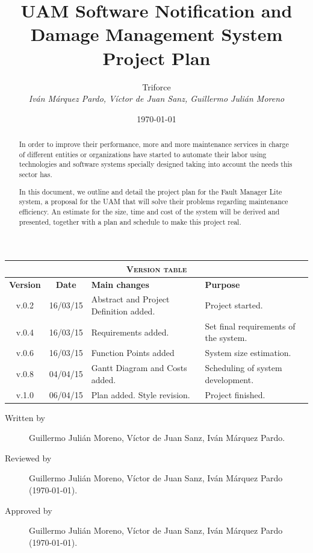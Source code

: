 \documentclass[11pt]{report}
\title{UAM Software Notification and Damage Management System \\ Project Plan}
\date{\today}
\author{{\Large Triforce} \\ \vspace{5pt} \textit{Iván Márquez Pardo, Víctor de Juan Sanz, Guillermo Julián Moreno}}
\begin{document}
\maketitle

\begin{table}[hbtp]
\centering
\begin{tabular}{|c|c|p{3cm}|p{3.5cm}|}
\hline \multicolumn{4}{|c|}{\textsc{Version table}} \\ \hline \hline
\textbf{Version} & \textbf{Date} & \textbf{Main changes} & \textbf{Purpose} \\ \hline
v.0.2 & 16/03/15 & Abstract and Project Definition added. & Project started. \\ \hline
v.0.4 & 16/03/15 & Requirements added. & Set final requirements of the system. \\ \hline
v.0.6 & 16/03/15 & Function Points added & System size estimation. \\ \hline
v.0.8 & 04/04/15 & Gantt Diagram and Costs added. & Scheduling of system development. \\ \hline
v.1.0 & 06/04/15 & Plan added. Style revision. & Project finished. \\ \hline
\end{tabular}
\end{table}

\begin{description}
\item[Written by] Guillermo Julián Moreno, Víctor de Juan Sanz, Iván Márquez Pardo.
\item[Reviewed by] Guillermo Julián Moreno, Víctor de Juan Sanz, Iván Márquez Pardo (\today).
\item[Approved by] Guillermo Julián Moreno, Víctor de Juan Sanz, Iván Márquez Pardo (\today).
\end{description}

\newpage

\begin{abstract}
In order to improve their performance, more and more maintenance services in charge of different entities or organizations have started to automate their labor using technologies and software systems specially designed taking into account the needs this sector has.

In this document, we outline and detail the project plan for the Fault Manager Lite system, a proposal for the UAM that will solve their problems regarding maintenance efficiency. An estimate for the size, time and cost of the system will be derived and presented, together with a plan and schedule to make this project real.
\end{abstract}
\end{document}
